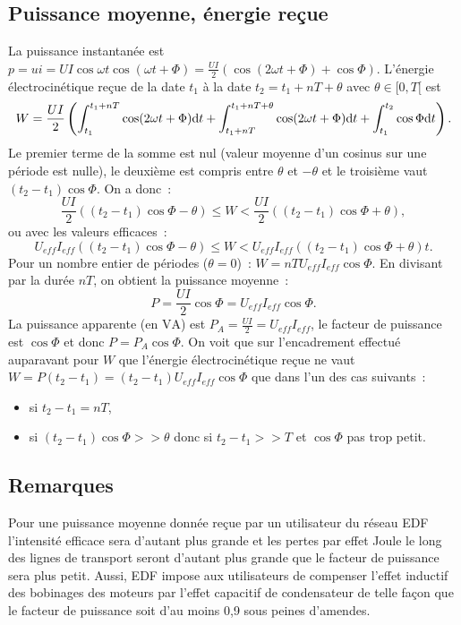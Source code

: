 \subsection{Puissance moyenne, énergie reçue}%
La puissance instantanée est \(p=ui=UI\cos\omega t \cos(\omega t +\Phi) = 
\frac{UI}{2} (\cos(2\omega t +\Phi)+\cos \Phi)\). L'énergie électrocinétique 
reçue de la date \(t_1\) à la date \(t_2=t_1+nT+\theta\) avec \(\theta \in [0, 
T[\) est
\begin{equation}%
  W = \frac{UI}{2}\left( \int_{t_1}^{t_1+nT} \cos(2\omega t +\Phi) \D t + 
  \int_{t_1+nT}^{t_1+nT+\theta} \cos(2\omega t +\Phi) \D t +\int_{t_1}^{t_2} 
  \cos\Phi \D t \right).
\end{equation}%
Le premier terme de la somme est nul (valeur moyenne d'un cosinus sur une 
période est nulle), le deuxième est compris entre \(\theta\) et \(-\theta\) et 
le troisième vaut \((t_2-t_1)\cos\Phi\). On a donc~:
\begin{equation}%
  \frac{UI}{2}((t_2-t_1)\cos\Phi-\theta) \leq W < 
  \frac{UI}{2}((t_2-t_1)\cos\Phi+\theta),
\end{equation}%
ou avec les valeurs efficaces~:
\begin{equation}%
  U_{eff}I_{eff}((t_2-t_1)\cos\Phi-\theta) \leq W < 
  U_{eff}I_{eff}((t_2-t_1)\cos\Phi+\theta)t.
\end{equation}%
Pour un nombre entier de périodes (\(\theta=0\))~: \(W = nT 
U_{eff}I_{eff}\cos\Phi\). En divisant par la durée \(nT\), on obtient la 
puissance moyenne~:
\begin{equation}%
  P = \frac{UI}{2}\cos\Phi = U_{eff}I_{eff}\cos\Phi.
\end{equation}%
La puissance apparente (en \(\si{\volt \ampere}\)) est \(P_A = \frac{UI}{2} = 
U_{eff}I_{eff}\), le facteur de puissance est \(\cos\Phi\) et donc \(P = P_A 
\cos\Phi\). On voit que sur l'encadrement effectué auparavant pour \(W\) que 
l'énergie électrocinétique reçue ne vaut \(W = P(t_2-t_1) = (t_2-t_1) 
U_{eff}I_{eff}\cos\Phi\) que dans l'un des cas suivants~:
\begin{itemize}%
  \item si \(t_2-t_1 = nT\), \item si \((t_2-t_1)\cos\Phi >> \theta\) donc si 
    \(t_2-t_1 >> T\) et \(\cos\Phi\) pas trop petit.
\end{itemize}%
\subsection{Remarques}%
Pour une puissance moyenne donnée reçue par un utilisateur du réseau EDF 
l'intensité efficace sera d'autant plus grande et les pertes par effet Joule le 
long des lignes de transport seront d'autant plus grande que le facteur de 
puissance sera plus petit. Aussi, EDF impose aux utilisateurs de compenser 
l'effet inductif des bobinages des moteurs par l'effet capacitif de 
condensateur de telle façon que le facteur de puissance soit d'au moins 0,9 
sous peines d'amendes.
